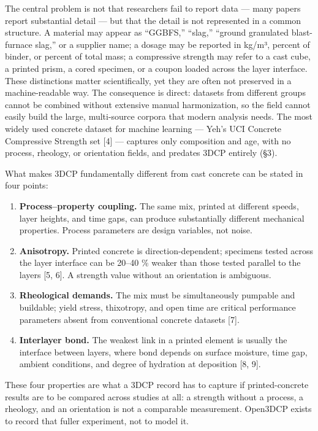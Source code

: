 \documentclass[
  11pt,
  letterpaper,
]{article}
\providecommand{\tightlist}{%
  \setlength{\itemsep}{0pt}\setlength{\parskip}{0pt}}
\begin{document}
The central problem is not that researchers fail to report data --- many
papers report substantial detail --- but that the detail is not
represented in a common structure. A material may appear as ``GGBFS,''
``slag,'' ``ground granulated blast-furnace slag,'' or a supplier name;
a dosage may be reported in kg/m³, percent of binder, or percent of
total mass; a compressive strength may refer to a cast cube, a printed
prism, a cored specimen, or a coupon loaded across the layer interface.
These distinctions matter scientifically, yet they are often not
preserved in a machine-readable way. The consequence is direct: datasets
from different groups cannot be combined without extensive manual
harmonization, so the field cannot easily build the large, multi-source
corpora that modern analysis needs. The most widely used concrete
dataset for machine learning --- Yeh's UCI Concrete Compressive Strength
set {[}4{]} --- captures only composition and age, with no process,
rheology, or orientation fields, and predates 3DCP entirely (§3).

What makes 3DCP fundamentally different from cast concrete can be stated
in four points:

\begin{enumerate}
\def\labelenumi{\arabic{enumi}.}
\tightlist
\item
  \textbf{Process--property coupling.} The same mix, printed at
  different speeds, layer heights, and time gaps, can produce
  substantially different mechanical properties. Process parameters are
  design variables, not noise.
\item
  \textbf{Anisotropy.} Printed concrete is direction-dependent;
  specimens tested across the layer interface can be 20--40 \% weaker
  than those tested parallel to the layers {[}5, 6{]}. A strength value
  without an orientation is ambiguous.
\item
  \textbf{Rheological demands.} The mix must be simultaneously pumpable
  and buildable; yield stress, thixotropy, and open time are critical
  performance parameters absent from conventional concrete datasets
  {[}7{]}.
\item
  \textbf{Interlayer bond.} The weakest link in a printed element is
  usually the interface between layers, where bond depends on surface
  moisture, time gap, ambient conditions, and degree of hydration at
  deposition {[}8, 9{]}.
\end{enumerate}

These four properties are what a 3DCP record has to capture if
printed-concrete results are to be compared across studies at all: a
strength without a process, a rheology, and an orientation is not a
comparable measurement. Open3DCP exists to record that fuller
experiment, not to model it.
\end{document}
